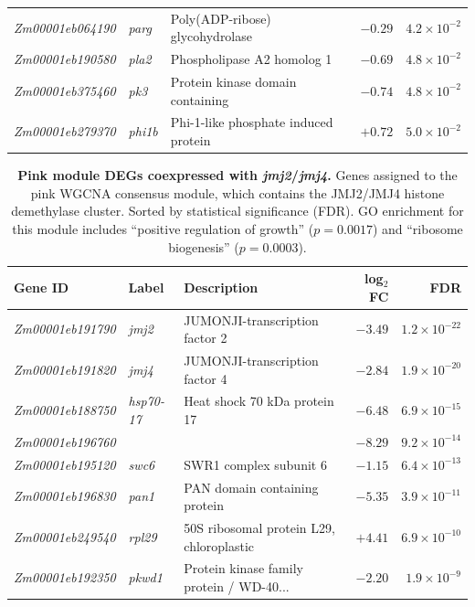 \documentclass[9pt,twocolumn,twoside]{rilabRxiv}
\newcommand{\jmjii}{\textit{jmj2}\xspace}
\newcommand{\jmjiv}{\textit{jmj4}\xspace}
\begin{document}
\begin{table}[!ht]
\begin{tabular}{@{}lllrr@{}}
\textit{Zm00001eb064190} & \textit{parg} & Poly(ADP-ribose) glycohydrolase & $-0.29$ & $4.2 \times 10^{-2}$ \\
\textit{Zm00001eb190580} & \textit{pla2} & Phospholipase A2 homolog 1 & $-0.69$ & $4.8 \times 10^{-2}$ \\
\textit{Zm00001eb375460} & \textit{pk3} & Protein kinase domain containing & $-0.74$ & $4.8 \times 10^{-2}$ \\
\textit{Zm00001eb279370} & \textit{phi1b} & Phi-1-like phosphate induced protein & $+0.72$ & $5.0 \times 10^{-2}$ \\
\bottomrule
\end{tabular}
\end{table}


\begin{table}[!ht]
\caption{\textbf{Pink module DEGs coexpressed with \jmjii/\jmjiv.} Genes assigned to the pink WGCNA consensus module, which contains the JMJ2/JMJ4 histone demethylase cluster. Sorted by statistical significance (FDR). GO enrichment for this module includes ``positive regulation of growth'' ($p = 0.0017$) and ``ribosome biogenesis'' ($p = 0.0003$).}
\label{tab::pink_module}
\centering
\small
\begin{tabular}{@{}lllrr@{}}
\toprule
\textbf{Gene ID} & \textbf{Label} & \textbf{Description} & \textbf{log$_2$FC} & \textbf{FDR} \\
\midrule
\textit{Zm00001eb191790} & \textit{jmj2} & JUMONJI-transcription factor 2 & $-3.49$ & $1.2 \times 10^{-22}$ \\
\textit{Zm00001eb191820} & \textit{jmj4} & JUMONJI-transcription factor 4 & $-2.84$ & $1.9 \times 10^{-20}$ \\
\textit{Zm00001eb188750} & \textit{hsp70-17} & Heat shock 70 kDa protein 17 & $-6.48$ & $6.9 \times 10^{-15}$ \\
\textit{Zm00001eb196760} &  &  & $-8.29$ & $9.2 \times 10^{-14}$ \\
\textit{Zm00001eb195120} & \textit{swc6} & SWR1 complex subunit 6 & $-1.15$ & $6.4 \times 10^{-13}$ \\
\textit{Zm00001eb196830} & \textit{pan1} & PAN domain containing protein & $-5.35$ & $3.9 \times 10^{-11}$ \\
\textit{Zm00001eb249540} & \textit{rpl29} & 50S ribosomal protein L29, chloroplastic & $+4.41$ & $6.9 \times 10^{-10}$ \\
\textit{Zm00001eb192350} & \textit{pkwd1} & Protein kinase family protein / WD-40... & $-2.20$ & $1.9 \times 10^{-9}$ \\

\end{tabular}
\end{table}
\end{document}
